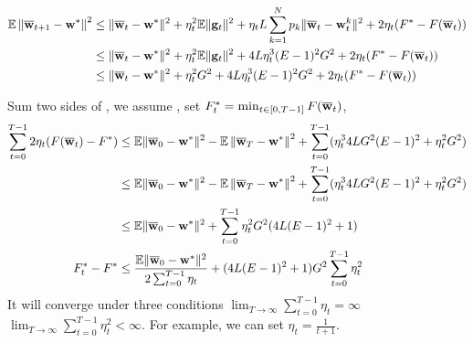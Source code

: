 \begin{align}
\mathbb{E}\left\|{\overline{\mathbf{w}}}_{t+1}-{\mathbf{w}}^{*}\right\|^2 &\leq \|{\overline{\mathbf{w}}}_{t}-{\mathbf{w}}^{*}\|^{2}+\eta_{t}^{2} \mathbb{E}\| {\mathbf{g}}_{t} \|^{2} + \eta_t L \sum_{k=1}^N p_k \|{\overline{\mathbf{w}}}_t - {\mathbf{w}}^{k}_t\|^2 + 2 \eta_{t} (F^* - F({\overline{\mathbf{w}}}_t))\\
&\leq \|{\overline{\mathbf{w}}}_{t}-{\mathbf{w}}^{*}\|^{2}+\eta_{t}^{2} \mathbb{E}\| {\mathbf{g}}_{t} \|^{2} +  4L\eta_t^3(E-1)^2 G^2 + 2 \eta_{t} (F^* - F({\overline{\mathbf{w}}}_t))\\
&\leq \|{\overline{\mathbf{w}}}_{t}-{\mathbf{w}}^{*}\|^{2}+\eta_{t}^{2} G^2 +  4L\eta_t^3(E-1)^2 G^2 + 2 \eta_{t} (F^* - F({\overline{\mathbf{w}}}_t)) \label{eq:cvxsgd1}
\end{align}

Sum two sides of \eq{\ref{eq:cvxsgd1}}, we assume , set $F^*_t = \min_{t \in [0, T-1]} F({\overline{\mathbf{w}}}_t)$, 
\begin{align*}
	\sum_{t=0}^{T-1} 2\eta_t (F({\overline{\mathbf{w}}}_t) - F^* ) & \leq \mathbb{E} \|{\overline{\mathbf{w}}}_{0}-{\mathbf{w}}^{*}\|^{2} - \mathbb{E}\left\|{\overline{\mathbf{w}}}_{T}-{\mathbf{w}}^{*}\right\|^2 + \sum_{t=0}^{T-1} (\eta_t^3 4LG^2(E-1)^2 + \eta_t^2 G^2)\\ 
    & \leq \mathbb{E} \|{\overline{\mathbf{w}}}_{0}-{\mathbf{w}}^{*}\|^{2} - \mathbb{E}\left\|{\overline{\mathbf{w}}}_{T}-{\mathbf{w}}^{*}\right\|^2 + \sum_{t=0}^{T-1} (\eta_t^3 4LG^2(E-1)^2 + \eta_t^2 G^2)\\ 
    & \leq \mathbb{E} \|{\overline{\mathbf{w}}}_{0}-{\mathbf{w}}^{*}\|^{2} + \sum_{t=0}^{T-1}\eta_t^2G^2 ( 4L(E-1)^2 + 1)\\
 F_t^* - F^*  & \leq \frac{\mathbb{E} \|{\overline{\mathbf{w}}}_{0}-{\mathbf{w}}^{*}\|^{2}}{2 \sum_{t=0}^{T-1} \eta_t } + ( 4L(E-1)^2 + 1)G^2 \sum_{t=0}^{T-1} \eta_t^2
\end{align*}
It will converge under three conditions $ \lim_{T \rightarrow \infty }\sum_{t=0}^{T-1} \eta_t = \infty$
$ \lim_{T \rightarrow \infty }\sum_{t=0}^{T-1} \eta_t^2 < \infty$. For example, we can set $\eta_t = \frac{1}{t+1}$.


	